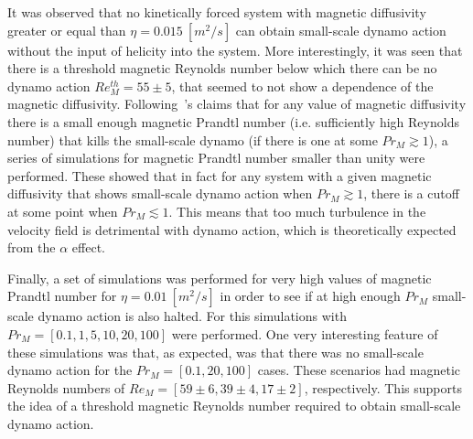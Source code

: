 \documentclass[a4paper,12pt]{article}
\begin{document}
It was observed that no kinetically forced system with magnetic diffusivity greater or equal than $\eta=0.015~[m^2/s]$ can obtain small-scale dynamo action without the input of helicity into the system. More interestingly, it was seen that there is a threshold magnetic Reynolds number below which there can be no dynamo action $Re_M^{th}=55\pm5$, that seemed to not show a dependence of the magnetic diffusivity. Following~\cite{schekochihin2004critical}'s claims that for any value of magnetic diffusivity there is a small enough magnetic Prandtl number (i.e. sufficiently high Reynolds number) that kills the small-scale dynamo (if there is one at some $Pr_M \gtrsim 1$), a series of simulations for magnetic Prandtl number smaller than unity were performed. These showed that in fact for any system with a given magnetic diffusivity that shows small-scale dynamo action when $Pr_M \gtrsim 1$, there is a cutoff at some point when $Pr_M \lesssim 1$. This means that too much turbulence in the velocity field is detrimental with dynamo action, which is theoretically expected from the $\alpha$ effect.

Finally, a set of simulations was performed for very high values of magnetic Prandtl number for $\eta=0.01~[m^2/s]$ in order to see if at high enough $Pr_M$ small-scale dynamo action is also halted. For this simulations with $Pr_M=[0.1, 1, 5, 10, 20, 100]$ were performed. One very interesting feature of these simulations was that, as expected, was that there was no small-scale dynamo action for the $Pr_M=[0.1, 20, 100]$ cases. These scenarios had magnetic Reynolds numbers of $Re_M=[59\pm6, 39\pm4, 17\pm2]$, respectively. This supports the idea of a threshold magnetic Reynolds number required to obtain small-scale dynamo action. 



\newpage



\end{document}
